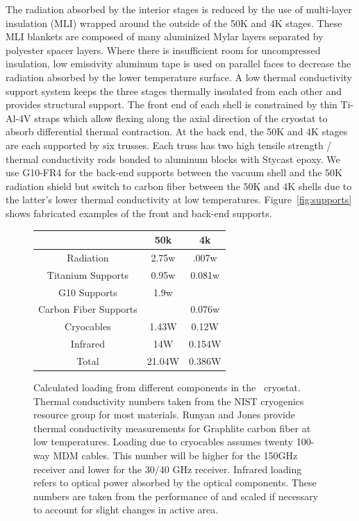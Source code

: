 \documentclass[]{spie}  %
\begin{document}
\clearpage


The radiation absorbed by the interior stages is reduced by the use of
multi-layer insulation (MLI) wrapped around the outside of the 50K and 4K
stages. These MLI blankets are composed of many aluminized Mylar layers
separated by polyester spacer layers. Where there is insufficient room for
uncompressed insulation, low emissivity aluminum tape is used on parallel
faces to decrease the radiation absorbed by the lower temperature surface.
A low thermal conductivity support system keeps the three stages thermally
insulated from each other and provides structural support. The front end of
each shell is constrained by thin Ti-Al-4V straps which allow flexing along the
axial direction of the cryostat to absorb differential thermal contraction. At
the back end, the 50K and 4K stages are each supported by six trusses. Each
truss has two high tensile strength / thermal conductivity rods bonded to
aluminum blocks with Stycast epoxy. We use G10-FR4 for the back-end supports
between the vacuum shell and the 50K radiation shield but switch to carbon
fiber between the 50K and 4K shells due to the latter's lower thermal
conductivity at low temperatures. Figure~\ref{fig:supports} shows fabricated
examples of the front and back-end supports.

\begin{figure}[t]
	\center
\begin{tabular}{|c||c|c|}
	\hline
	 & 50k & 4k \\
	 \hline
	Radiation & 2.75w & .007w \\
	Titanium Supports & 0.95w & 0.081w \\
	G10 Supports & 1.9w & \\
	Carbon Fiber Supports & & 0.076w\\
	Cryocables & 1.43W & 0.12W \\
	Infrared & 14W & 0.154W \\
	\hline
	Total & 21.04W & 0.386W \\
	\hline
\end{tabular}

	\caption{Calculated loading from different components in the \biceparray\
	cryostat. Thermal conductivity numbers taken from the NIST cryogenics
	resource group\cite{nist} for most materials. Runyan and
	Jones\cite{runyan2008} provide thermal conductivity measurements for
	Graphlite carbon fiber at low temperatures. Loading due to cryocables
	assumes twenty 100-way MDM cables. This number will be higher for the
	150GHz receiver and lower for the 30/40 GHz receiver. Infrared loading
	refers to optical power absorbed by the optical components. These numbers
	are taken from the performance of \bicep3 and scaled if necessary to
	account for slight changes in active area.}
	\label{tab:loading}

\end{figure}
\end{document}
